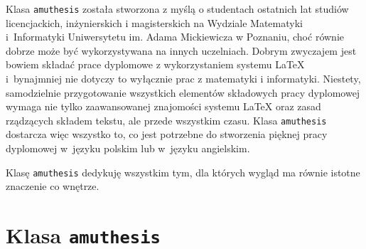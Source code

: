 \documentclass[twoside,leftblank,polski]{amuthesis}
\author{Bartłomiej Przybylski}
\date{Poznań, wrzesień 2017}
\begin{document}
\maketitle

\makestatement

\begin{streszczenie}
Klasa \texttt{amuthesis} została stworzona z myślą o studentach ostatnich lat studiów licencjackich, inżynierskich i magisterskich na Wydziale Matematyki i~Informatyki Uniwersytetu im. Adama Mickiewicza w Poznaniu, choć równie dobrze może być wykorzystywana na innych uczelniach. Dobrym zwyczajem jest bowiem składać prace dyplomowe z wykorzystaniem systemu \LaTeX{} i~bynajmniej nie dotyczy to wyłącznie prac z matematyki i informatyki. Niestety, samodzielnie przygotowanie wszystkich elementów składowych pracy dyplomowej wymaga nie tylko zaawansowanej znajomości systemu \LaTeX{} oraz zasad rządzących składem tekstu, ale przede wszystkim czasu. Klasa \texttt{amuthesis} dostarcza więc wszystko to, co jest potrzebne do stworzenia pięknej pracy dyplomowej w~języku polskim lub w~języku angielskim.
\end{streszczenie}

\begin{abstract}
\lipsum[1]
\end{abstract}

\begin{dedykacja}
Klasę \texttt{amuthesis} dedykuję wszystkim tym, dla których wygląd ma równie istotne znaczenie co wnętrze.
\end{dedykacja}

\tableofcontents

\chapter{Klasa \texttt{amuthesis}}
\end{document}
